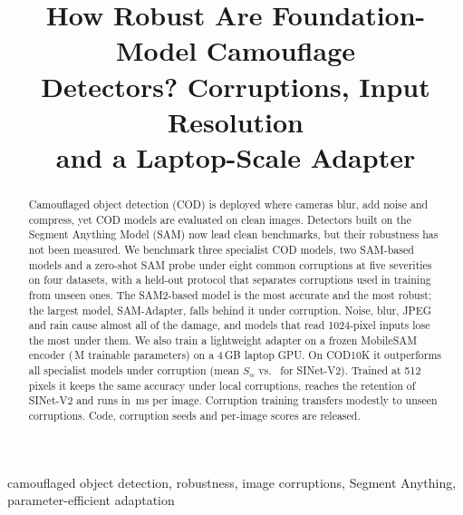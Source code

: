 \documentclass[conference]{IEEEtran}
\newcommand{\Sa}{$S_\alpha$}
\begin{document}
\title{How Robust Are Foundation-Model Camouflage\\ Detectors? Corruptions, Input Resolution\\ and a Laptop-Scale Adapter}

\author{
\and
{}
}

\maketitle

\begin{abstract}
Camouflaged object detection (COD) is deployed where cameras blur, add noise and compress, yet COD models are evaluated on clean images. Detectors built on the Segment Anything Model (SAM) now lead clean benchmarks, but their robustness has not been measured. We benchmark three specialist COD models, two SAM-based models and a zero-shot SAM probe under eight common corruptions at five severities on four datasets, with a held-out protocol that separates corruptions used in training from unseen ones. The SAM2-based model is the most accurate and the most robust; the largest model, SAM-Adapter, falls behind it under corruption. Noise, blur, JPEG and rain cause almost all of the damage, and models that read 1024-pixel inputs lose the most under them. We also train a lightweight adapter on a frozen MobileSAM encoder (\NParamsTrainable\,M trainable parameters) on a 4\,GB laptop GPU. On COD10K it outperforms all specialist models under corruption (mean \Sa{} \NOursCodMcorr{} vs.\ \NSinetCodMcorr{} for SINet-V2). Trained at 512 pixels it keeps the same accuracy under local corruptions, reaches the retention of SINet-V2 and runs in \NEffOursFiveLatency\,ms per image. Corruption training transfers modestly to unseen corruptions. Code, corruption seeds and per-image scores are released.
\end{abstract}

\begin{IEEEkeywords}
camouflaged object detection, robustness, image corruptions, Segment Anything, parameter-efficient adaptation
\end{IEEEkeywords}
\end{document}

